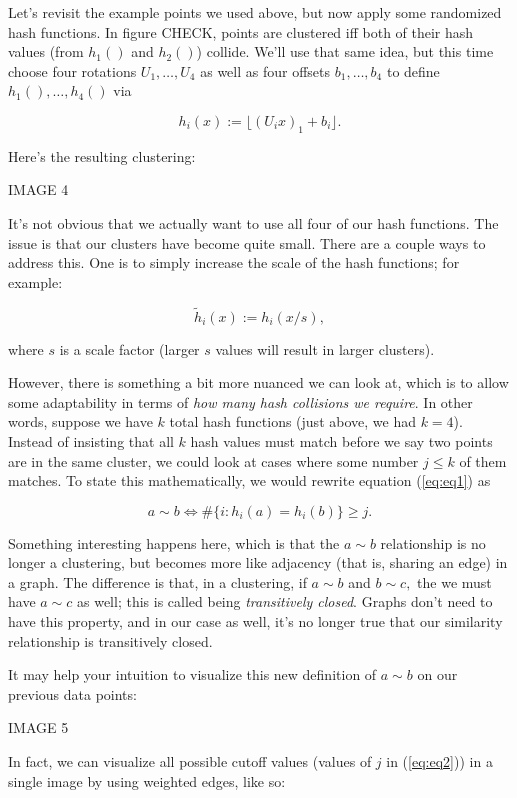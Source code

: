 \documentclass[20pt,]{extarticle}
\begin{document}
Let's revisit the example points we used above, but now apply some
randomized hash functions. In figure CHECK, points are clustered iff
both of their hash values (from \(h_1()\) and \(h_2()\)) collide. We'll
use that same idea, but this time choose four rotations
\(U_1, \ldots, U_4\) as well as four offsets \(b_1, \ldots, b_4\) to
define \(h_1(), \ldots, h_4()\) via

\[ h_i(x) := \lfloor (U_i x)_1 + b_i \rfloor. \]

Here's the resulting clustering:

IMAGE 4

It's not obvious that we actually want to use all four of our hash
functions. The issue is that our clusters have become quite small. There
are a couple ways to address this. One is to simply increase the scale
of the hash functions; for example:

\[ \tilde h_i(x) := h_i(x/s), \]

where \(s\) is a scale factor (larger \(s\) values will result in larger
clusters).

However, there is something a bit more nuanced we can look at, which is
to allow some adaptability in terms of \emph{how many hash collisions we
require}. In other words, suppose we have \(k\) total hash functions
(just above, we had \(k=4\)). Instead of insisting that all \(k\) hash
values must match before we say two points are in the same cluster, we
could look at cases where some number \(j \le k\) of them matches. To
state this mathematically, we would rewrite equation (\ref{eq:eq1}) as

\begin{equation} a \sim b \iff \#\{i: h_i(a) = h_i(b)\} \ge j. \label{eq:eq2}\end{equation}

Something interesting happens here, which is that the \(a \sim b\)
relationship is no longer a clustering, but becomes more like adjacency
(that is, sharing an edge) in a graph. The difference is that, in a
clustering, if \(a\sim b\) and \(b\sim c,\) the we must have \(a\sim c\)
as well; this is called being \emph{transitively closed}. Graphs don't
need to have this property, and in our case as well, it's no longer true
that our similarity relationship is transitively closed.

It may help your intuition to visualize this new definition of
\(a\sim b\) on our previous data points:

IMAGE 5

In fact, we can visualize all possible cutoff values (values of \(j\) in
(\ref{eq:eq2})) in a single image by using weighted edges, like so:
\end{document}
